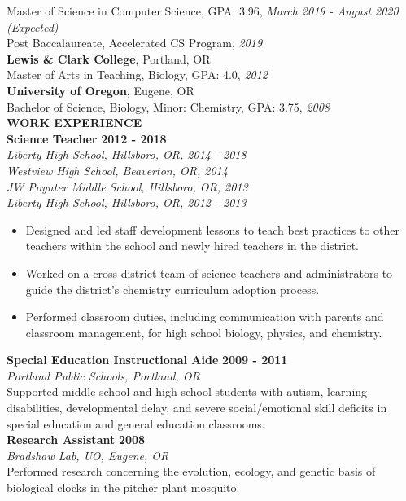 \documentclass[11pt]{article}
\begin{document}
Master of Science in Computer Science, GPA: 3.96, \textit{March 2019 - August 2020 (Expected)}\\ %
Post Baccalaureate, Accelerated CS Program, \textit{2019} \medskip \\
%
\textbf{Lewis \& Clark College}, Portland, OR\\
Master of Arts in Teaching, Biology, GPA: 4.0, \textit{2012} \medskip \\
%
\textbf{University of Oregon}, Eugene, OR\\
Bachelor of Science, Biology, Minor: Chemistry, GPA: 3.75, \textit{2008} \bigskip \\
\makebox[0pt][l]{\rule[-.2\baselineskip]{\linewidth}{.3mm}}%
\large{\textbf{WORK EXPERIENCE}}\smallskip \\
%
\textbf{Science Teacher} \hfill \textbf{2012 - 2018}\\
\textit{Liberty High School, Hillsboro, OR, 2014 - 2018}\\
\textit{Westview High School, Beaverton, OR, 2014}\\
\textit{JW Poynter Middle School, Hillsboro, OR, 2013}\\
\textit{Liberty High School, Hillsboro, OR, 2012 - 2013}
%
\begin{itemize}[leftmargin=*, itemsep=0pt, topsep=5pt]
	\item Designed and led staff development lessons to teach best practices to other teachers within the school and newly hired teachers in the district.
	\item Worked on a cross-district team of science teachers and administrators to guide the district’s chemistry curriculum adoption process.
	\item Performed classroom duties, including communication with parents and classroom management, for high school biology, physics, and chemistry.
\end{itemize}
\medbreak \noindent
%
\textbf{Special Education Instructional Aide} \hfill \textbf{2009 - 2011}\\
\textit{Portland Public Schools, Portland, OR}\\
Supported middle school and high school students with autism, learning disabilities, developmental delay, and severe social/emotional skill deficits in special education and general education classrooms.\medskip\\
%
\textbf{Research Assistant} \hfill \textbf{2008}\\
\textit{Bradshaw Lab, UO, Eugene, OR}\\
Performed research concerning the evolution, ecology, and genetic basis of biological clocks in the pitcher plant mosquito.
\end{document}
